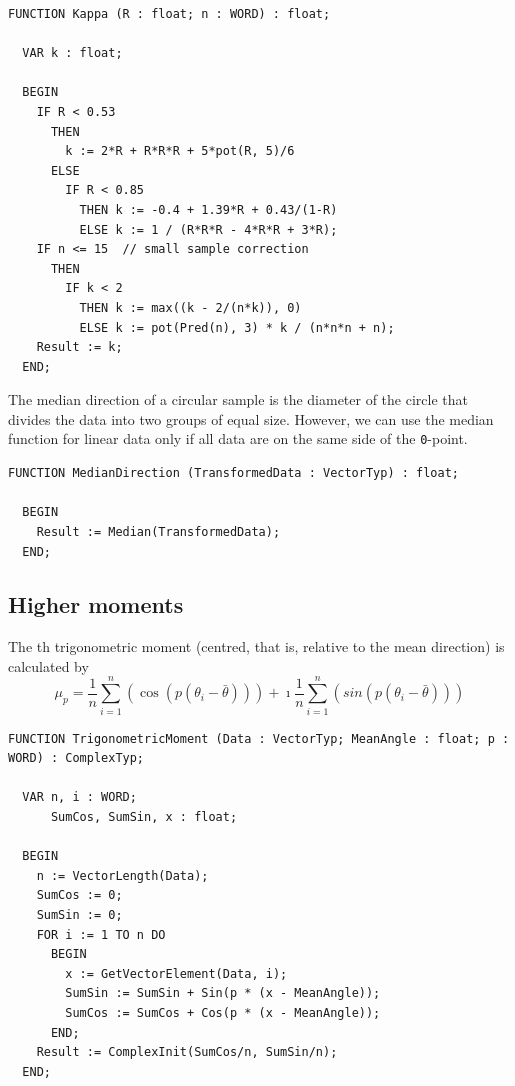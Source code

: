 \begin{refsection}
\begin{lstlisting}[caption=Maximum likelihood estimator of \skalar{\kappa}]
  FUNCTION Kappa (R : float; n : WORD) : float;

  VAR k : float;

  BEGIN
    IF R < 0.53
      THEN
        k := 2*R + R*R*R + 5*pot(R, 5)/6
      ELSE
        IF R < 0.85
          THEN k := -0.4 + 1.39*R + 0.43/(1-R)
          ELSE k := 1 / (R*R*R - 4*R*R + 3*R);
    IF n <= 15  // small sample correction
      THEN
        IF k < 2
          THEN k := max((k - 2/(n*k)), 0)
          ELSE k := pot(Pred(n), 3) * k / (n*n*n + n);
    Result := k;
  END;
\end{lstlisting}

The median direction of a circular sample is the diameter of the circle that divides the data into two groups of equal size. However, we can use the median function for linear data only if all data are on the same side of the \texttt{0}-point.

\begin{lstlisting}[caption=Median of circular data]
  FUNCTION MedianDirection (TransformedData : VectorTyp) : float;

  BEGIN
    Result := Median(TransformedData);
  END;
\end{lstlisting}

\subsection{Higher moments}

The th trigonometric moment (centred, that is, relative to the mean direction) is calculated by
\begin{equation}
  \mu_p = \frac{1}{n} \sum_{i=1}^n(\cos(p (\theta_i - \bar{\theta}))) + \imath \frac{1}{n} \sum_{i=1}^n(sin(p (\theta_i - \bar{\theta})))
\end{equation}

\begin{lstlisting}[caption=p-th trigonometric moment]
  FUNCTION TrigonometricMoment (Data : VectorTyp; MeanAngle : float; p : WORD) : ComplexTyp;

  VAR n, i : WORD;
      SumCos, SumSin, x : float;

  BEGIN
    n := VectorLength(Data);
    SumCos := 0;
    SumSin := 0;
    FOR i := 1 TO n DO
      BEGIN
        x := GetVectorElement(Data, i);
        SumSin := SumSin + Sin(p * (x - MeanAngle));
        SumCos := SumCos + Cos(p * (x - MeanAngle));
      END;
    Result := ComplexInit(SumCos/n, SumSin/n);
  END;
\end{lstlisting}


\end{refsection}
